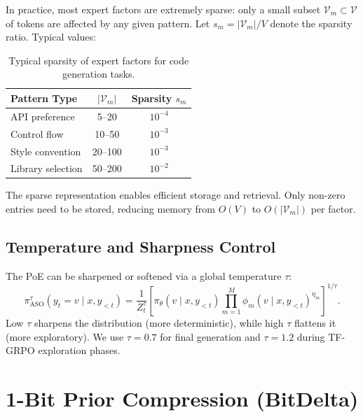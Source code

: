 \documentclass[11pt]{article}
\begin{document}
In practice, most expert factors are extremely sparse: only a small subset
$\mathcal{V}_m \subset \mathcal{V}$ of tokens are affected by any given pattern.
Let $s_m = |\mathcal{V}_m| / V$ denote the sparsity ratio. Typical values:

\begin{table}[h]
\centering
\begin{tabular}{lcc}
\toprule
Pattern Type & $|\mathcal{V}_m|$ & Sparsity $s_m$ \\
\midrule
API preference & 5--20 & $10^{-4}$ \\
Control flow & 10--50 & $10^{-3}$ \\
Style convention & 20--100 & $10^{-3}$ \\
Library selection & 50--200 & $10^{-2}$ \\
\bottomrule
\end{tabular}
\caption{Typical sparsity of expert factors for code generation tasks.}
\label{tab:sparsity}
\end{table}

The sparse representation enables efficient storage and retrieval. Only non-zero
entries need to be stored, reducing memory from $O(V)$ to $O(|\mathcal{V}_m|)$
per factor.

\subsection{Temperature and Sharpness Control}

The PoE can be sharpened or softened via a global temperature $\tau$:
\begin{equation}
    \pi_{\text{ASO}}^\tau(y_t = v \mid x, y_{<t})
    = \frac{1}{Z_t^\tau} \left[\pi_\theta(v \mid x, y_{<t})
    \prod_{m=1}^{M} \phi_m(v \mid x, y_{<t})^{\eta_m}\right]^{1/\tau}.
\end{equation}
Low $\tau$ sharpens the distribution (more deterministic), while high $\tau$
flattens it (more exploratory). We use $\tau = 0.7$ for final generation and
$\tau = 1.2$ during TF-GRPO exploration phases.

\section{1-Bit Prior Compression (BitDelta)}
\label{sec:bitdelta}
\end{document}
